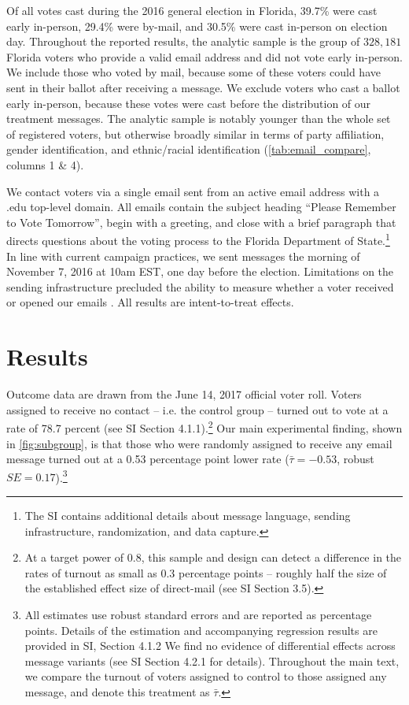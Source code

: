 \documentclass[12pt]{article}
\begin{document}
Of all votes cast during the 2016 general election in Florida, 39.7\%
were cast early in-person, 29.4\% were by-mail, and 30.5\% were cast
in-person on election day. Throughout the reported results, the
analytic sample is the group of $328,181$ Florida voters who provide a
valid email address and did not vote early in-person. We include those
who voted by mail, because some of these voters could have sent in
their ballot after receiving a message. We exclude voters who cast a
ballot early in-person, because these votes were cast before the
distribution of our treatment messages. The analytic sample is notably
younger than the whole set of registered voters, but otherwise broadly
similar in terms of party affiliation, gender identification, and
ethnic/racial identification (\autoref{tab:email_compare}, columns 1
\& 4).



We contact voters via a single email sent from an active email address
with a .edu top-level domain. All emails contain the subject heading
``Please Remember to Vote Tomorrow'', begin with a greeting, and close
with a brief paragraph that directs questions about the voting process
to the Florida Department of State.\footnote{The SI contains
  additional details about message language, sending infrastructure,
  randomization, and data capture.}  In line with current campaign
practices, we sent messages the morning of November 7, 2016 at 10am
EST, one day before the election. Limitations on the sending
infrastructure precluded the ability to measure whether a voter
received or opened our emails \citep{hughes2019}. All results are
intent-to-treat effects.

\section{Results}

Outcome data are drawn from the June 14, 2017 official voter roll.
Voters assigned to receive no contact -- i.e. the control group --
turned out to vote at a rate of 78.7 percent (see SI Section
4.1.1).\footnote{At a target power of 0.8, this sample and design can
  detect a difference in the rates of turnout as small as 0.3
  percentage points -- roughly half the size of the established effect
  size of direct-mail (see SI Section 3.5).}  Our main experimental
finding, shown in \autoref{fig:subgroup}, is that those who were
randomly assigned to receive any email message turned out at a 0.53
percentage point lower rate ($\bar{\tau} = -0.53$, robust
$SE = 0.17$).\footnote{All estimates use robust standard
  errors and are reported as percentage points. Details of the estimation and accompanying regression
  results are provided in SI, Section 4.1.2 We find no evidence of
  differential effects across message variants (see SI Section 4.2.1
  for details). Throughout the main text, we compare the turnout of
  voters assigned to control to those assigned any message, and denote
  this treatment as $\bar{\tau}$. }
\end{document}
